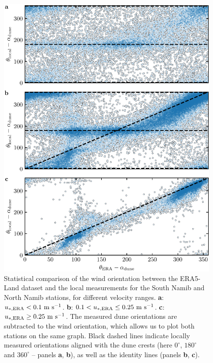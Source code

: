 \begin{figure}[p]
\centering
\includegraphics[scale=1]{Figures/Figure8_supp.pdf}
\caption{Statistical comparison of the wind orientation between the ERA5-Land dataset and the local measurements for the South Namib and North Namib stations, for different velocity ranges. \textbf{a}: $u_{*, \textup{\textup{ERA}}} < 0.1~\textup{m}~\textup{s}^{-1}$. \textbf{b}: $0.1 < u_{*, \textup{\textup{ERA}}} \leq 0.25~\textup{m}~\textup{s}^{-1}$. \textbf{c}: $u_{*, \textup{\textup{ERA}}} \geq 0.25~\textup{m}~\textup{s}^{-1}$. The measured dune orientations are subtracted to the wind orientation, which allows us to plot both stations on the same graph. Black dashed lines indicate locally measured orientations aligned with the dune crests (here $0^\circ$, $180^\circ$ and $360^\circ$ -- panels \textbf{a}, \textbf{b}), as well as the identity lines (panels \textbf{b}, \textbf{c}).}
\label{Fig8_supp}
\end{figure}

